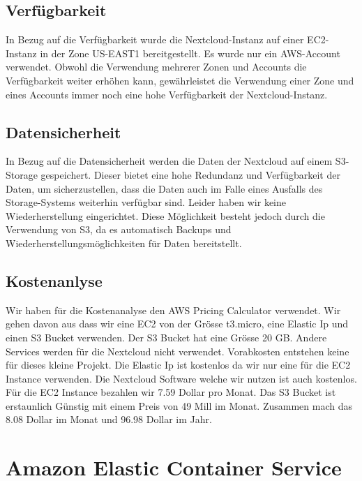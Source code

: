 \documentclass{article}
\begin{document}
\subsection{Verfügbarkeit}

\noindent In Bezug auf die Verfügbarkeit wurde die Nextcloud-Instanz auf einer EC2-Instanz in der Zone US-EAST1 bereitgestellt. Es wurde nur ein AWS-Account verwendet. Obwohl die Verwendung mehrerer Zonen und Accounts die Verfügbarkeit weiter erhöhen kann, gewährleistet die Verwendung einer Zone und eines Accounts immer noch eine hohe Verfügbarkeit der Nextcloud-Instanz.

\subsection{Datensicherheit}

\noindent In Bezug auf die Datensicherheit werden die Daten der Nextcloud auf einem S3-Storage gespeichert. Dieser bietet eine hohe Redundanz und Verfügbarkeit der Daten, um sicherzustellen, dass die Daten auch im Falle eines Ausfalls des Storage-Systems weiterhin verfügbar sind. Leider haben wir keine Wiederherstellung eingerichtet. Diese Möglichkeit besteht jedoch durch die Verwendung von S3, da es automatisch Backups und Wiederherstellungsmöglichkeiten für Daten bereitstellt.

\subsection{Kostenanlyse}
Wir haben für die Kostenanalyse den AWS Pricing Calculator verwendet. Wir gehen davon aus dass wir eine EC2 von der Grösse t3.micro, eine Elastic Ip und einen S3 Bucket verwenden. Der S3 Bucket hat eine Grösse 20 GB. Andere Services werden für die Nextcloud nicht verwendet.
\newline
Vorabkosten entstehen keine für dieses kleine Projekt. Die Elastic Ip ist kostenlos da wir nur eine für die EC2 Instance verwenden. Die Nextcloud Software welche wir nutzen ist auch kostenlos. Für die EC2 Instance bezahlen wir 7.59 Dollar pro Monat. Das S3 Bucket ist erstaunlich Günstig mit einem Preis von 49 Mill im Monat. Zusammen mach das 8.08 Dollar im Monat und 96.98 Dollar im Jahr.

\clearpage

\section{Amazon Elastic Container Service }
\end{document}
